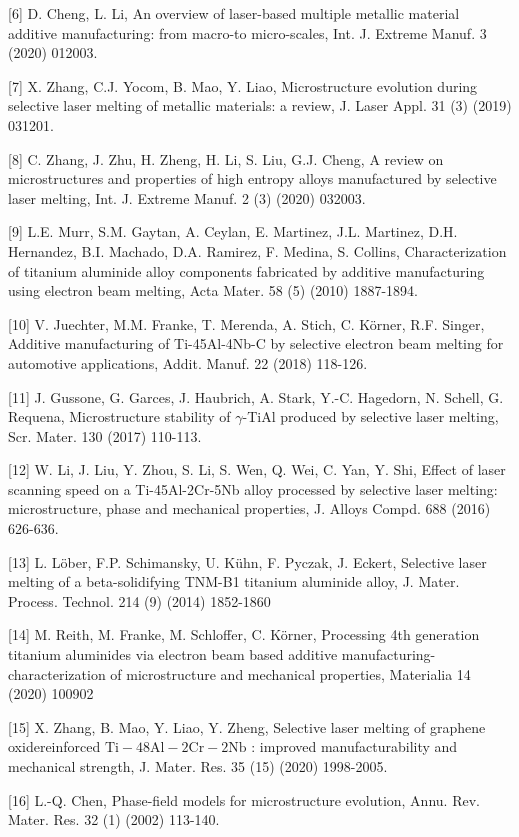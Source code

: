 \documentclass[10pt]{article}
\begin{document}
[6] D. Cheng, L. Li, An overview of laser-based multiple metallic material additive manufacturing: from macro-to micro-scales, Int. J. Extreme Manuf. 3 (2020) 012003.

[7] X. Zhang, C.J. Yocom, B. Mao, Y. Liao, Microstructure evolution during selective laser melting of metallic materials: a review, J. Laser Appl. 31 (3) (2019) 031201.

[8] C. Zhang, J. Zhu, H. Zheng, H. Li, S. Liu, G.J. Cheng, A review on microstructures and properties of high entropy alloys manufactured by selective laser melting, Int. J. Extreme Manuf. 2 (3) (2020) 032003.

[9] L.E. Murr, S.M. Gaytan, A. Ceylan, E. Martinez, J.L. Martinez, D.H. Hernandez, B.I. Machado, D.A. Ramirez, F. Medina, S. Collins, Characterization of titanium aluminide alloy components fabricated by additive manufacturing using electron beam melting, Acta Mater. 58 (5) (2010) 1887-1894.

[10] V. Juechter, M.M. Franke, T. Merenda, A. Stich, C. Körner, R.F. Singer, Additive manufacturing of Ti-45Al-4Nb-C by selective electron beam melting for automotive applications, Addit. Manuf. 22 (2018) 118-126.

[11] J. Gussone, G. Garces, J. Haubrich, A. Stark, Y.-C. Hagedorn, N. Schell, G. Requena, Microstructure stability of $\gamma$-TiAl produced by selective laser melting, Scr. Mater. 130 (2017) 110-113.

[12] W. Li, J. Liu, Y. Zhou, S. Li, S. Wen, Q. Wei, C. Yan, Y. Shi, Effect of laser scanning speed on a Ti-45Al-2Cr-5Nb alloy processed by selective laser melting: microstructure, phase and mechanical properties, J. Alloys Compd. 688 (2016) 626-636.

[13] L. Löber, F.P. Schimansky, U. Kühn, F. Pyczak, J. Eckert, Selective laser melting of a beta-solidifying TNM-B1 titanium aluminide alloy, J. Mater. Process. Technol. 214 (9) (2014) 1852-1860

[14] M. Reith, M. Franke, M. Schloffer, C. Körner, Processing 4th generation titanium aluminides via electron beam based additive manufacturing-characterization of microstructure and mechanical properties, Materialia 14 (2020) 100902

[15] X. Zhang, B. Mao, Y. Liao, Y. Zheng, Selective laser melting of graphene oxidereinforced $\mathrm{Ti}-48 \mathrm{Al}-2 \mathrm{Cr}-2 \mathrm{Nb}$ : improved manufacturability and mechanical strength, J. Mater. Res. 35 (15) (2020) 1998-2005.

[16] L.-Q. Chen, Phase-field models for microstructure evolution, Annu. Rev. Mater. Res. 32 (1) (2002) 113-140.
\end{document}
